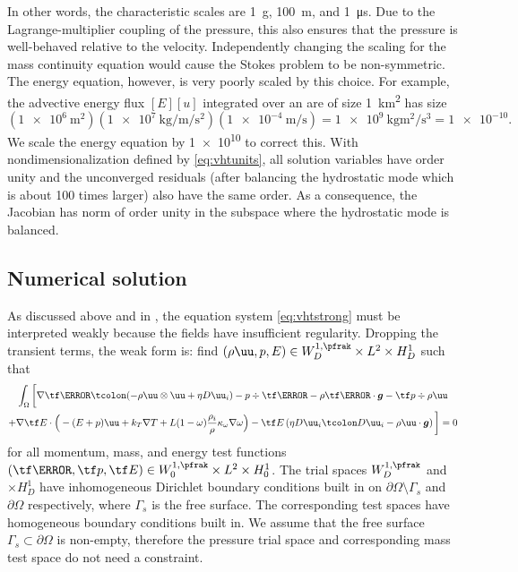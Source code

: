 In other words, the characteristic scales are \SI{1}{\gram}, \SI{100}{\metre}, and \SI{1}{\micro\second}.
Due to the Lagrange-multiplier coupling of the pressure, this also ensures that the pressure is well-behaved relative to the velocity.
Independently changing the scaling for the mass continuity equation would cause the Stokes problem to be non-symmetric.
The energy equation, however, is very poorly scaled by this choice.
For example, the advective energy flux $[E][u]$ integrated over an are of size \SI{1}{\kilo\metre\squared} has size
\begin{equation*}
  (\SI{1e6}{\metre\squared}) (\SI{1e7}{\kilo\gram\per\metre\per\second\squared}) (\SI{1e-4}{\metre\per\second}) = \SI{1e9}{\kilo\gram\metre\squared\per\second\cubed} = \num{1e-10} .
\end{equation*}
We scale the energy equation by \num{1e10} to correct this.
With nondimensionalization defined by \eqref{eq:vhtunits}, all solution variables have order unity and the unconverged residuals (after balancing the hydrostatic mode which is about 100 times larger) also have the same order.
As a consequence, the Jacobian has norm of order unity in the subspace where the hydrostatic mode is balanced.

\subsection{Numerical solution}\label{sec:vhtalgebraic}
As discussed above and in , the equation system \eqref{eq:vhtstrong} must be interpreted weakly because the fields have insufficient regularity.
Dropping the transient terms, the weak form is: find $(\rho\uu,p,E) \in W^{1,\pfrak}_D \times L^2 \times H^1_D$ such that
\begin{multline}\label{eq:vhtweak}
  \int_\Omega \bigg[
    \nabla\tf\mm \tcolon ( -\rho\uu\otimes\uu + \eta D\uu_i) - p\div\tf\mm - \rho \tf\mm\cdot \bm g -\tf p \div \rho\uu \\
    + \nabla\tf E \cdot \Big(
      -(E+p)\uu + k_T\nabla T + L (1-\omega)\frac{\rho_i}{\rho}\kappa_\omega\nabla\omega
    \Big) - \tf E \left( \eta D\uu_i\tcolon D\uu_i - \rho\uu\cdot\bm g \right)
    \bigg] = 0
\end{multline}
for all momentum, mass, and energy test functions $(\tf\mm,\tf p,\tf E) \in W^{1,\pfrak}_0 \times L^2 \times H^1_0$.
The trial spaces $W^{1,\pfrak}_D$ and $\times H^1_D$ have inhomogeneous Dirichlet boundary conditions built in on $\partial\Omega\setminus \Gamma_s$ and $\partial\Omega$ respectively, where $\Gamma_s$ is the free surface.
The corresponding test spaces have homogeneous boundary conditions built in.
We assume that the free surface $\Gamma_s \subset \partial\Omega$ is non-empty, therefore the pressure trial space and corresponding mass test space do not need a constraint.

